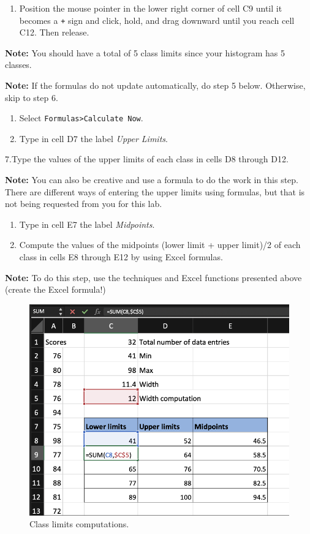 \documentclass[
]{book}
\providecommand{\tightlist}{%
  \setlength{\itemsep}{0pt}\setlength{\parskip}{0pt}}
\begin{document}
\begin{enumerate}
\def\labelenumi{\arabic{enumi}.}
\setcounter{enumi}{3}
\tightlist
\item
  Position the mouse pointer in the lower right corner of cell C9 until it becomes a \texttt{+} sign and click, hold, and drag downward until you reach cell C12. Then release.
\end{enumerate}

\textbf{Note:} You should have a total of 5 class limits since your histogram has 5 classes.

\textbf{Note:} If the formulas do not update automatically, do step 5 below. Otherwise, skip to step 6.

\begin{enumerate}
\def\labelenumi{\arabic{enumi}.}
\setcounter{enumi}{4}
\tightlist
\item
  Select \texttt{Formulas\textgreater{}Calculate\ Now}.
\item
  Type in cell D7 the label \emph{Upper Limits}.
\end{enumerate}

7.Type the values of the upper limits of each class in cells D8 through D12.

\textbf{Note:} You can also be creative and use a formula to do the work in this step. There are different ways of entering the upper limits using formulas, but that is not being requested from you for this lab.

\begin{enumerate}
\def\labelenumi{\arabic{enumi}.}
\setcounter{enumi}{7}
\tightlist
\item
  Type in cell E7 the label \emph{Midpoints}.
\item
  Compute the values of the midpoints (lower limit + upper limit)/2 of each class in cells E8 through E12 by using Excel formulas.
\end{enumerate}

\textbf{Note:} To do this step, use the techniques and Excel functions presented above (create the Excel formula!)

\begin{figure}

{\centering \includegraphics[width=0.5\linewidth]{class-limits-comp} 

}

\caption{Class limits computations.}\label{fig:class-limits-comp}
\end{figure}
\end{document}
